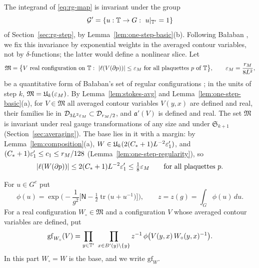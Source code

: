 The integrand of \eqref{eq:rg-map} is invariant under the group
\[
\mathcal G'=\{u:\T\to G:\ u|_{\T'}=1\}
\]
of Section~\ref{sec:rg-step}, by Lemma~\ref{lem:one-step-basic}(b). Following Ba\l aban \cite[(0.14)--(0.16)]{BalYM4I}, we fix this invariance by exponential weights in the averaged contour variables, not by $\delta$-functions; the latter would define a nonlinear slice. Let
\[
\mathfrak M=\big\{V\ \text{real configuration on }\mathbb T:\ |\ell(V(\partial p))|\le\varepsilon_M\ \text{for all plaquettes }p\text{ of }\mathbb T\big\},\qquad\varepsilon_M=\frac{r_M}{8L^2},
\]
be a quantitative form of Ba\l aban's set of regular configurations \cite[p.~254]{BalYM4I}; in the units of step $k$, $\mathfrak M=\mathfrak U_k(\varepsilon_M)$. By Lemma~\ref{lem:stokes-avg} and Lemma~\ref{lem:one-step-basic}(a), for $V\in\mathfrak M$ all averaged contour variables $V(y,x)$ are defined and real, their families lie in $\mathcal D_{3L^2\varepsilon_M}\subset\mathcal D_{r_M/2}$, and $\mathfrak a'(V)$ is defined and real. The set $\mathfrak M$ is invariant under real gauge transformations of any size and under $\mathfrak S_{k+1}$ (Section~\ref{sec:averaging}). The base lies in it with a margin: by Lemma~\ref{lem:composition}(a), $W\in\mathfrak U_k(2(C_*+1)L^{-2}\varepsilon'_1)$, and $(C_*+1)\varepsilon'_1\le c_1\le r_M/128$ (Lemma~\ref{lem:one-step-regularity}), so
\begin{equation}\label{eq:base-regular}
|\ell(W(\partial p))|\le2(C_*+1)L^{-2}\varepsilon'_1\le\tfrac18\varepsilon_M\qquad\text{for all plaquettes }p.
\end{equation}

\begin{definition}\label{def:gauge-fixing}
For $u\in G^c$ put
\[
\phi(u)=\exp\Big(-\frac1{g^2}\Big[\mathsf N-\tfrac12\operatorname{tr}\big(u+u^{-1}\big)\Big]\Big),\qquad z=z(g)=\int_G\phi(u)\,du .
\]
For a real configuration $W_\circ\in\mathfrak M$ and a configuration $V$ whose averaged contour variables are defined, put
\[
\mathrm{gf}_{W_\circ}(V)=\prod_{y\in\T'}\ \prod_{x\in B'(y)\setminus\{y\}}z^{-1}\,\phi\big(V(y,x)\,W_\circ(y,x)^{-1}\big).
\]
In this part $W_\circ=W$ is the base, and we write $\mathrm{gf}_W$.
\end{definition}


